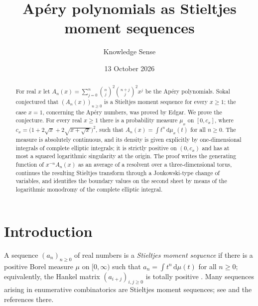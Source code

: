 \documentclass[11pt]{amsart}
\numberwithin{equation}{section}
\theoremstyle{definition}
\theoremstyle{remark}
\newcommand{\dd}{\,\mathrm{d}}
\begin{document}
\title[Ap\'ery polynomials as Stieltjes moment sequences]{Ap\'ery polynomials as Stieltjes moment sequences}

\author{Knowledge Sense}
\address{Knowledge Sense}

\date{13 October 2026}



\begin{abstract}
For real $x$ let $A_n(x)=\sum_{j=0}^{n}\binom{n}{j}^2\binom{n+j}{j}^2x^j$ be the
Ap\'ery polynomials. Sokal conjectured that $(A_n(x))_{n\ge0}$ is a Stieltjes
moment sequence for every $x\ge1$; the case $x=1$, concerning the Ap\'ery
numbers, was proved by Edgar. We prove the conjecture. For every real $x\ge1$
there is a probability measure $\mu_x$ on $[0,c_x]$, where
$c_x=\bigl(1+2\sqrt{x}+2\sqrt{x+\sqrt{x}}\bigr)^2$, such that
$A_n(x)=\int t^n\dd\mu_x(t)$ for all $n\ge0$. The measure is absolutely
continuous, and its density is given explicitly by one-dimensional integrals
of complete elliptic integrals; it is strictly positive on $(0,c_x)$ and has
at most a squared logarithmic singularity at the origin. The proof writes the
generating function of $x^{-n}A_n(x)$ as an average of a resolvent over a
three-dimensional torus, continues the resulting Stieltjes transform through a
Joukowski-type change of variables, and identifies the boundary values on the
second sheet by means of the logarithmic monodromy of the complete elliptic
integral.
\end{abstract}

\maketitle

\section{Introduction}

A sequence $(a_n)_{n\ge0}$ of real numbers is a \emph{Stieltjes moment
sequence} if there is a positive Borel measure $\mu$ on $[0,\infty)$ such that
$a_n=\int t^n\dd\mu(t)$ for all $n\ge0$; equivalently, the Hankel matrix
$(a_{i+j})_{i,j\ge0}$ is totally positive \cite{WZ}. Many sequences
arising in enumerative combinatorics are Stieltjes moment sequences; see \cite{So20,WZ}
and the references there.
\end{document}
